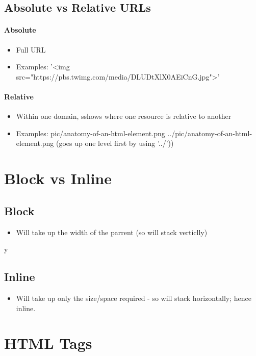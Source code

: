 \documentclass[]{article}
\newcommand{\<}{\guilsinglleft}
\renewcommand{\>}{\guilsinglright}
\begin{document}
\subsection{Absolute vs Relative URLs}
\paragraph{Absolute}

	\begin{itemize}
		\item Full URL
		\item Examples:
		\subitem '<img src="https://pbs.twimg.com/media/DLUDtXlX0AEiCnG.jpg">'
	\end{itemize}

\paragraph{Relative}

	\begin{itemize}
		\item Within one domain, sshows where one resource is relative to another
		\item Examples:
		\subitem pic/anatomy-of-an-html-element.png
		\subitem ../pic/anatomy-of-an-html-element.png (goes up one level first by using '../'))
	\end{itemize}

\section{Block vs Inline}
\subsection{Block}
\begin{itemize}
	\item Will take up the width of the parrent (so will stack verticlly)
\end{itemize}y
\subsection{Inline} 
\begin{itemize}
	\item Will take up only the size/space required - so will stack horizontally; hence inline.
\end{itemize}

\section{HTML Tags}
\end{document}
